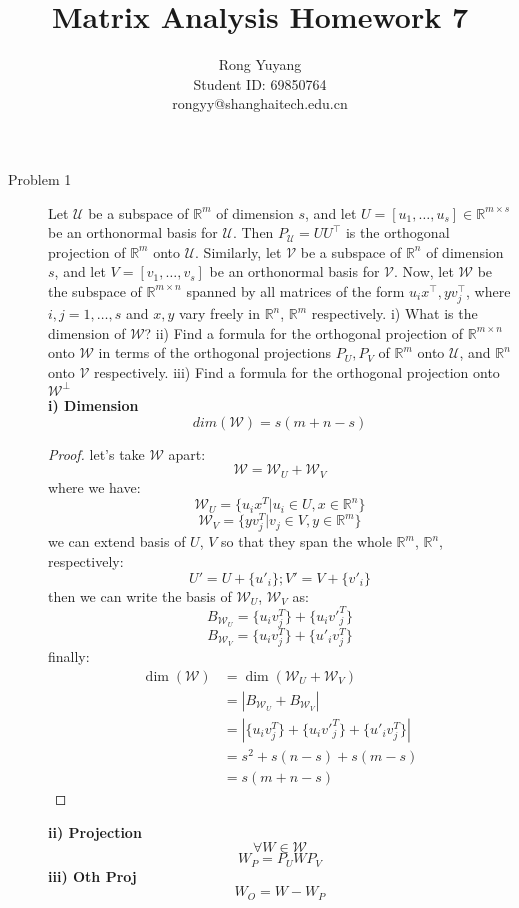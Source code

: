 \documentclass{article}
\title{Matrix Analysis Homework 7}
\author{Rong Yuyang \\ Student ID: 69850764 \\ rongyy@shanghaitech.edu.cn}
\begin{document}
\maketitle

\begin{description}
	\item[Problem 1] Let $\mathcal{U}$ be a subspace of $\mathbb{R}^{m}$ of dimension $s$, and let $U=[u_1,\dots,u_s]\in\mathbb{R}^{m\times s}$ be an orthonormal basis for $\mathcal{U}$. Then $P_{\mathcal{U}} = U U^\top$ is the orthogonal projection of $\mathbb{R}^{m}$ onto $\mathcal{U}$. Similarly, let $\mathcal{V}$ be a subspace of $\mathbb{R}^{n}$ of dimension $s$, and let $V=[v_1,\dots,v_s]$ be an orthonormal basis for $\mathcal{V}$. Now, let $\mathcal{W}$ be the subspace of $\mathbb{R}^{m\times n}$ spanned by all matrices of the form $u_i x^\top, y v_j^\top$, where $i,j=1,\dots,s$ and $x,y$ vary freely in $\mathbb{R}^{n}$, $\mathbb{R}^{m}$ respectively. i) What is the dimension of $\mathcal{W}$? ii) Find a formula for the orthogonal projection of $\mathbb{R}^{m\times n}$ onto $\mathcal{W}$ in terms of the orthogonal projections $P_U,P_V$ of $\mathbb{R}^{m}$ onto $\mathcal{U}$, and $\mathbb{R}^{n}$ onto $\mathcal{V}$ respectively. iii) Find a formula for the orthogonal projection onto $\mathcal{W}^\perp$ \\
	\textbf{i) Dimension}
		$$dim(\mathcal{W}) = s(m+n-s)$$
		\begin{proof}
			let's take $\mathcal{W}$ apart:
			$$\mathcal{W} = \mathcal{W}_U + \mathcal{W}_V$$
			where we have:
			$$ \mathcal{W}_U = \{u_ix^T | u_i \in U, x \in \mathbb{R}^n\}$$
			$$ \mathcal{W}_V = \{yv_j^T | v_j \in V, y \in \mathbb{R}^m\}$$
			we can extend basis of $U$, $V$ so that they span the whole $\mathbb{R}^m$, $\mathbb{R}^n$, respectively:
			$$U' = U + \{u'_i\}; V' = V + \{v'_i\}$$
			then we can write the basis of $ \mathcal{W}_U$, $\mathcal{W}_V$ as:
			$$B_{\mathcal{W}_U} = \{u_iv_j^T\} + \{u_iv'_j^T\}$$
			$$B_{\mathcal{W}_V} = \{u_iv_j^T\} + \{u'_iv_j^T\}$$
			finally:
			\begin{equation}\begin{aligned}
				\dim(\mathcal{W}) 
				& = \dim(\mathcal{W}_U + \mathcal{W}_V) \\
				& = |B_{\mathcal{W}_U} + B_{\mathcal{W}_V}| \\
				& = |\{u_iv_j^T\} + \{u_iv'_j^T\} + \{u'_iv_j^T\}| \\
				& = s^2 + s(n-s) + s(m-s) \\
				& = s(m+n-s)
			\end{aligned}\end{equation} 
		\end{proof}
	\textbf{ii) Projection}
		$$\forall W \in \mathcal{W}$$
		$$W_P = P_UWP_V$$
	\textbf{iii) Oth Proj}
		$$W_O = W - W_P$$


\end{description}
\end{document}

